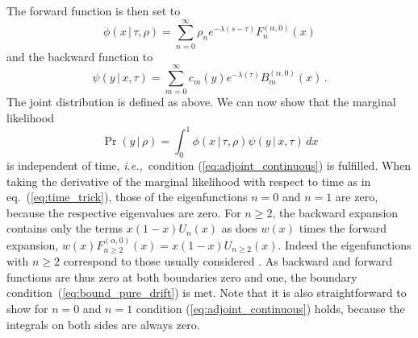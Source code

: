 \documentclass[preprint]{elsarticle}
\newcommand\given{{\,|\,}}
\newcommand\ie{{\it i.e.,}}
\newcommand\y{\ensuremath{y}}
\begin{document}
The forward function is then set to
\begin{equation}
  \phi(x\given \tau,\rho)=\sum_{n=0}^\infty \rho_n e^{-\lambda(s-\tau)} F_n^{(\alpha,0)}(x)
\end{equation}
and the backward function to
\begin{equation}
\psi(\y\given x,\tau)=\sum_{m=0}^\infty c_m(\y) e^{-\lambda(\tau)} B_m^{(\alpha,0)}(x)\,.
\end{equation} 
The joint distribution is defined as above. We can now show that the marginal likelihood 
\begin{equation}
  \Pr(\y\given \rho)=\int_0^1 \phi(x\given \tau, \rho)\psi(\y\given x,\tau)\,dx
\end{equation}
is independent of time, \ie\  condition (\ref{eq:adjoint_continuous}) is fulfilled. When taking the derivative of the marginal likelihood with respect to time as in eq.~(\ref{eq:time_trick}), those of the eigenfunctions $n=0$ and $n=1$ are zero, because the respective eigenvalues are zero. For $n\geq 2$, the backward expansion contains only the terms $x(1-x)U_n(x)$ as does $w(x)$ times the forward expansion, $w(x)F_{n\geq2}^{(\alpha,0)}(x)=x(1-x)U_{n\geq2}(x)$. Indeed the eigenfunctions with $n\geq2$ correspond to those usually considered \citep{Kimu55,Song12}. As backward and forward functions are thus zero at both boundaries zero and one, the boundary condition~(\ref{eq:bound_pure_drift}) is met. Note that it is also straightforward to show for $n=0$ and $n=1$ condition (\ref{eq:adjoint_continuous}) holds, because the integrals on both sides are always zero.

\end{document}

